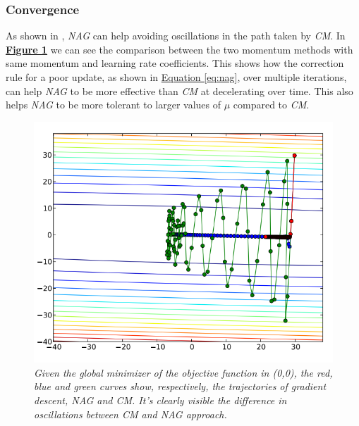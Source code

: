 \subsubsection{Convergence}
\label{conv_mom}
As shown in \cite{momentum}, \textit{NAG} can help avoiding oscillations in the path taken by \textit{CM}. In \hyperref[fig:convNAGvsCM]{\textbf{Figure \ref{fig:convNAGvsCM}}} we can see the comparison between the two momentum methods with same momentum and learning rate coefficients. This shows how the correction rule for a poor update, as shown in \hyperref[eq:nag]{Equation \ref{eq:nag}}, over multiple iterations, can help \textit{NAG} to be more effective than \textit{CM} at decelerating over time. This also helps \textit{NAG} to be more tolerant to larger values of $\mu$ compared to \textit{CM}.
\begin{figure}[H]
	\centering
	\includegraphics[width=0.4\linewidth]{res/convNAGvsCM.png}
	\caption{\textit{Given the global minimizer of the objective function in (0,0), the red, blue and green curves show, respectively, the trajectories of \textit{gradient descent}, \textit{NAG} and \textit{CM}. It's clearly visible the difference in oscillations between \textit{CM} and \textit{NAG} approach.}}
	\label{fig:convNAGvsCM}
\end{figure}

